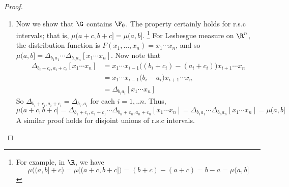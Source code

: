 \documentclass{article} %
\newenvironment{alphabate}
    {\begin{enumerate}[label=\alph*)]}
	{\end{enumerate} }
\begin{document}
\begin{proof}
\begin{enumerate}
\begin{alphabate}
 	Now we handle decreasing sequences.  So we want to show $B_n \in \G, B_n \downarrow B \implies B \in G$.  We could use the same argument as above with continuity from above instead of continuity from below, but continuity from above only applies for sets with finite measure.  However, Lesbesgue measure is $\sigma$-finite, so we can handle this problem in the standard way.\footnote{In particular, we write $\Omega = \cupdot_{n=1}^\infty \Omega_n$ where $\mu (\Omega_n) < \infty$.\footnote{Recall that we can represent any union as a disjoint union; see Section \ref{sec:representing_unions_as_disjoint_unions}.}  Then we define a finite measure $\mu_n$ via $\mu_n(A) := \mu(A \cap \Omega_n)$.  We have 
 		\[ \mu(A) = \sum_{n=1}^\infty \mu_n(A), \quad (*)\]
 		since $\mu(A) = \mu(\cupdot A \cap \Omega_n) = \sum_n \mu(A \cap \Omega_n) = \sum_n \mu_n(A)$.
 		
 		Now, using the continuity from above argument for finite measures, we have 
 			\[ \mu_n(B+c) = \mu_n(B), \quad (+)\]
 			
 		And so
 		\[\mu(B+c) \stackrel{(*)}{=} \sum_n \mu_n (B+c)   \stackrel{(+)}{=}  \sum_n \mu_n(B) \stackrel{(*)}{=} \mu(B)  \]
 	}
% 
	\item Now we show that $\G$ contains $\F_0$. The property certainly holds for r.s.c intervals; that is, $\mu(a+c,b+c] = \mu(a,b]$. \footnote{ For example, in $\R$, we have
	\[ \mu\big( (a,b] + c \big) = \mu\big( (a+c,b+c]\big) =(b+c) - (a+c) = b-a = \mu(a,b]\] 
	}  For Lesbesgue measure on $\R^n$, the distribution function is $F(x_1, ..., x_n) = x_1 \cdots x_n$, and so $\mu (a,b] = \Delta_{b_1 a_1} \cdots \Delta_{b_n a_n} [x_1 \cdots x_n]$. Now note that
		\begin{align*}
		\Delta_{b_i + c_i, a_i+c_i} [x_1 \cdots x_n] &= x_1 \cdots x_{i-1} \bigg( (b_i + c_i) - (a_i + c_i)  \bigg) x_{i+1} \cdots x_n \\
		& = x_1 \cdots x_{i-1} \bigg( b_i - a_i  \bigg) x_{i+1} \cdots x_n \\
		&= \Delta_{b_i a_i} [x_1 \cdots x_n]  
		\end{align*}
	So $\Delta_{b_i + c_i, a_i+c_i} = \Delta_{b_i, a_i}$ for each $i=1,..n$.  Thus,  
	\[ \mu(a+c,b+c] = \Delta_{b_1+c_1, a_1 +c_1} \cdots \Delta_{b_n+c_n, a_n+c_n} [x_1 \cdots x_n] = \Delta_{b_1 a_1} \cdots \Delta_{b_n a_n} [x_1 \cdots x_n] = \mu(a,b] \] 
	A similar proof holds for disjoint unions of r.s.c intervals.
	\end{alphabate}
\end{enumerate}


\end{proof}
\end{document}
